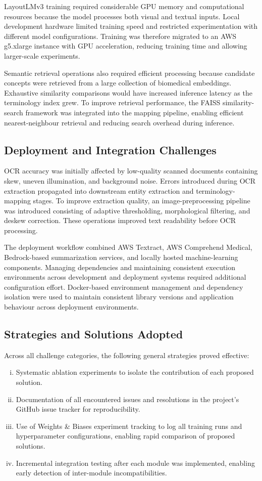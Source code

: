 LayoutLMv3 training required considerable GPU memory and computational resources because the model processes both visual and textual inputs. Local development hardware limited training speed and restricted experimentation with different model configurations. Training was therefore migrated to an AWS g5.xlarge instance with GPU acceleration, reducing training time and allowing larger-scale experiments.

Semantic retrieval operations also required efficient processing because candidate concepts were retrieved from a large collection of biomedical embeddings. Exhaustive similarity comparisons would have increased inference latency as the terminology index grew. To improve retrieval performance, the FAISS similarity-search framework was integrated into the mapping pipeline, enabling efficient nearest-neighbour retrieval and reducing search overhead during inference.

\subsection{Deployment and Integration Challenges}

OCR accuracy was initially affected by low-quality scanned documents containing skew, uneven illumination, and background noise. Errors introduced during OCR extraction propagated into downstream entity extraction and terminology-mapping stages. To improve extraction quality, an image-preprocessing pipeline was introduced consisting of adaptive thresholding, morphological filtering, and deskew correction. These operations improved text readability before OCR processing.

The deployment workflow combined AWS Textract, AWS Comprehend Medical, Bedrock-based summarization services, and locally hosted machine-learning components. Managing dependencies and maintaining consistent execution environments across development and deployment systems required additional configuration effort. Docker-based environment management and dependency isolation were used to maintain consistent library versions and application behaviour across deployment environments.

\subsection{Strategies and Solutions Adopted}
Across all challenge categories, the following general strategies proved effective:
\begin{enumerate}[(i)]
    \item Systematic ablation experiments to isolate the contribution of each proposed solution.
    \item Documentation of all encountered issues and resolutions in the project's GitHub issue tracker for reproducibility.
    \item Use of Weights \& Biases experiment tracking to log all training runs and hyperparameter configurations, enabling rapid comparison of proposed solutions.
    \item Incremental integration testing after each module was implemented, enabling early detection of inter-module incompatibilities.
\end{enumerate}

